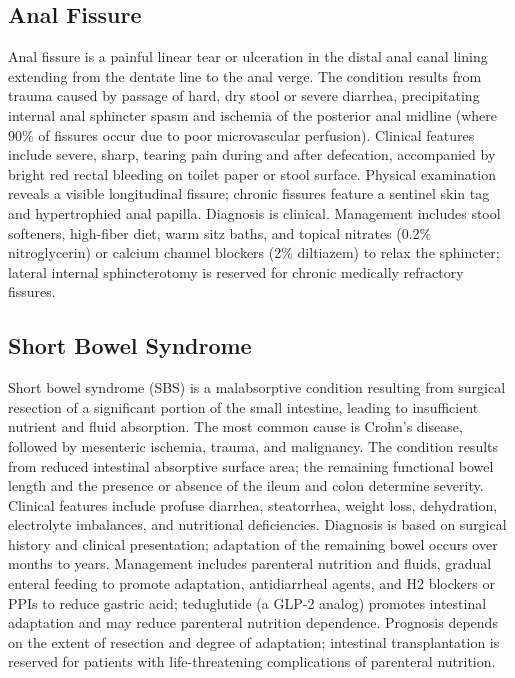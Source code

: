 \subsection{Anal Fissure}
\label{sec:Anal Fissure}
Anal fissure is a painful linear tear or ulceration in the distal anal canal lining extending from the dentate line to the anal verge. The condition results from trauma caused by passage of hard, dry stool or severe diarrhea, precipitating internal anal sphincter spasm and ischemia of the posterior anal midline (where 90\% of fissures occur due to poor microvascular perfusion). Clinical features include severe, sharp, tearing pain during and after defecation, accompanied by bright red rectal bleeding on toilet paper or stool surface. Physical examination reveals a visible longitudinal fissure; chronic fissures feature a sentinel skin tag and hypertrophied anal papilla. Diagnosis is clinical. Management includes stool softeners, high-fiber diet, warm sitz baths, and topical nitrates (0.2\% nitroglycerin) or calcium channel blockers (2\% diltiazem) to relax the sphincter; lateral internal sphincterotomy is reserved for chronic medically refractory fissures.

\subsection{Short Bowel Syndrome}
\label{sec:Short Bowel Syndrome}
Short bowel syndrome (SBS) is a malabsorptive condition resulting from surgical resection of a significant portion of the small intestine, leading to insufficient nutrient and fluid absorption. The most common cause is Crohn's disease, followed by mesenteric ischemia, trauma, and malignancy. The condition results from reduced intestinal absorptive surface area; the remaining functional bowel length and the presence or absence of the ileum and colon determine severity. Clinical features include profuse diarrhea, steatorrhea, weight loss, dehydration, electrolyte imbalances, and nutritional deficiencies. Diagnosis is based on surgical history and clinical presentation; adaptation of the remaining bowel occurs over months to years. Management includes parenteral nutrition and fluids, gradual enteral feeding to promote adaptation, antidiarrheal agents, and H2 blockers or PPIs to reduce gastric acid; teduglutide (a GLP-2 analog) promotes intestinal adaptation and may reduce parenteral nutrition dependence. Prognosis depends on the extent of resection and degree of adaptation; intestinal transplantation is reserved for patients with life-threatening complications of parenteral nutrition.

